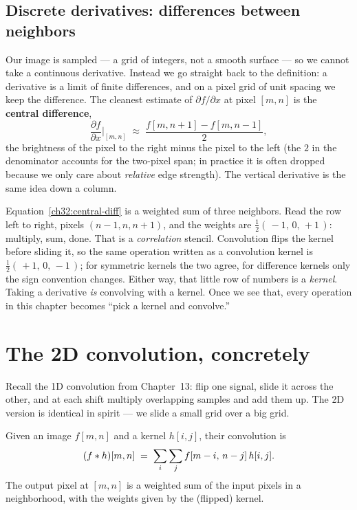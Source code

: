 \subsection{Discrete derivatives: differences between neighbors}

Our image is sampled --- a grid of integers, not a smooth surface --- so we
cannot take a continuous derivative. Instead we go straight back to the definition:
a derivative is a limit of finite differences, and on a pixel grid of unit spacing we keep the
difference. The cleanest estimate of $\partial f/\partial x$ at pixel $[m,n]$
is the \textbf{central difference},
\begin{equation}
\label{ch32:central-diff}
\frac{\partial f}{\partial x}\bigg|_{[m,n]} \;\approx\; \frac{f[m,n+1] - f[m,n-1]}{2},
\end{equation}
the brightness of the pixel to the right minus the pixel to the left (the $2$
in the denominator accounts for the two-pixel span; in practice it is often
dropped because we only care about \emph{relative} edge strength). The vertical
derivative is the same idea down a column.

Equation~\eqref{ch32:central-diff} is a weighted sum of three neighbors. Read the
row left to right, pixels $(n-1, n, n+1)$, and the weights are
$\tfrac12(\,-1,\,0,\,+1\,)$: multiply, sum, done. That is a \emph{correlation}
stencil. Convolution flips the kernel before sliding it, so the same operation
written as a convolution kernel is $\tfrac12(\,+1,\,0,\,-1\,)$; for symmetric
kernels the two agree, for difference kernels only the sign convention changes.
Either way, that little row of numbers is a \emph{kernel}. Taking a derivative \emph{is} convolving with a kernel. Once we
see that, every operation in this chapter becomes ``pick a kernel and
convolve.''

\section{The 2D convolution, concretely}
\label{ch32:2d-conv}

Recall the 1D convolution from Chapter~13: flip one signal, slide it across the
other, and at each shift multiply overlapping samples and add them up. The 2D
version is identical in spirit --- we slide a small grid over a big grid.

\begin{definition}[2D convolution]
\label{ch32:def-conv}
Given an image $f[m,n]$ and a kernel $h[i,j]$, their convolution is
\begin{equation}
\label{ch32:conv2d}
(f \ast h)[m,n] \;=\; \sum_{i}\sum_{j} f[m-i,\,n-j]\,h[i,j].
\end{equation}
The output pixel at $[m,n]$ is a weighted sum of the input pixels in a
neighborhood, with the weights given by the (flipped) kernel.
\end{definition}


